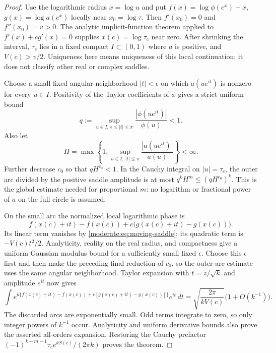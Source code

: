 \begin{proof}
Use the logarithmic radius $x=\log u$ and put
$f(x)=\log\phi(e^x)-x$, $g(x)=\log a(e^x)$ locally near
$x_0=\log\tau$. Then $f'(x_0)=0$ and $f''(x_0)=v>0$.
The analytic implicit-function theorem applied to
$f'(x)+cg'(x)=0$ supplies $x(c)=\log\tau_c$ near zero.
After shrinking the interval, $\tau_c$ lies in a fixed compact
$I\subset(0,1)$ where $a$ is positive, and $V(c)>v/2$.
Uniqueness here means uniqueness of this local continuation; it does
not classify other real or complex saddles.

Choose a small fixed angular neighborhood $|t|<\epsilon$ on which
$a(ue^{it})$ is nonzero for every $u\in I$. Positivity of the
Taylor coefficients of $\phi$ gives a strict uniform bound
\[
 q:=\sup_{u\in I,\ \epsilon\le|t|\le\pi}
         \frac{|\phi(ue^{it})|}{\phi(u)}<1.
\]
Also let
\[
 H=\max\left\{1,\sup_{u\in I,\ |t|\le\pi}
                   \frac{|a(ue^{it})|}{a(u)}\right\}<\infty.
\]
Further decrease $c_0$ so that $qH^{c_0}<1$. In the Cauchy integral
on $|u|=\tau_c$, the outer arc divided by the positive saddle
amplitude is at most $q^kH^m\le(qH^{c_0})^k$.
This is the global estimate needed for proportional $m$: no logarithm
or fractional power of $a$ on the full circle is assumed.

On the small arc the normalized local logarithmic phase is
\[
 f(x(c)+it)-f(x(c))
     +c\bigl(g(x(c)+it)-g(x(c))\bigr).
\]
Its linear term vanishes by \eqref{moderate:eq:moving-saddle}; its
quadratic term is $-V(c)t^2/2$. Analyticity, reality on the real
radius, and compactness give a uniform Gaussian modulus bound for
a sufficiently small fixed $\epsilon$. Choose this $\epsilon$ first
and then make the preceding final reduction of $c_0$, so the outer-arc
estimate uses the same angular neighborhood. Taylor expansion with $t=z/\sqrt k$ and
amplitude $e^{it}$ now gives
\[
 \int e^{k\{f(x(c)+it)-f(x(c))
                +c[g(x(c)+it)-g(x(c))]\}}e^{it}\,dt
 =\sqrt{\frac{2\pi}{kV(c)}}\bigl(1+O(k^{-1})\bigr).
\]
The discarded arcs are exponentially small. Odd terms integrate to
zero, so only integer powers of $k^{-1}$ occur. Analyticity and
uniform derivative bounds also prove the asserted all-orders
expansion. Restoring the Cauchy prefactor
$(-1)^{k+m-1}\tau_c e^{kS(c)}/(2\pi k)$ proves the theorem.
\end{proof}

